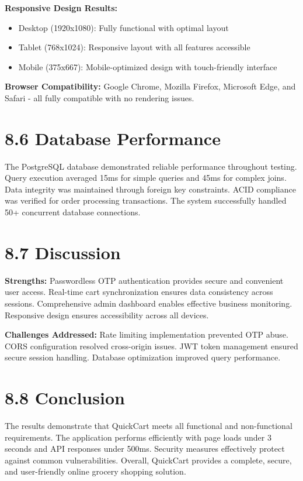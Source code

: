 \documentclass[12pt,a4paper]{report}
\begin{document}
\textbf{Responsive Design Results:}
\begin{itemize}
    \item Desktop (1920x1080): Fully functional with optimal layout
    \item Tablet (768x1024): Responsive layout with all features accessible
    \item Mobile (375x667): Mobile-optimized design with touch-friendly interface
\end{itemize}

\textbf{Browser Compatibility:} Google Chrome, Mozilla Firefox, Microsoft Edge, and Safari - all fully compatible with no rendering issues.

\section*{8.6 Database Performance}

The PostgreSQL database demonstrated reliable performance throughout testing. Query execution averaged 15ms for simple queries and 45ms for complex joins. Data integrity was maintained through foreign key constraints. ACID compliance was verified for order processing transactions. The system successfully handled 50+ concurrent database connections.

\section*{8.7 Discussion}

\textbf{Strengths:} Passwordless OTP authentication provides secure and convenient user access. Real-time cart synchronization ensures data consistency across sessions. Comprehensive admin dashboard enables effective business monitoring. Responsive design ensures accessibility across all devices.

\textbf{Challenges Addressed:} Rate limiting implementation prevented OTP abuse. CORS configuration resolved cross-origin issues. JWT token management ensured secure session handling. Database optimization improved query performance.

\section*{8.8 Conclusion}

The results demonstrate that QuickCart meets all functional and non-functional requirements. The application performs efficiently with page loads under 3 seconds and API responses under 500ms. Security measures effectively protect against common vulnerabilities. Overall, QuickCart provides a complete, secure, and user-friendly online grocery shopping solution.
\end{document}
